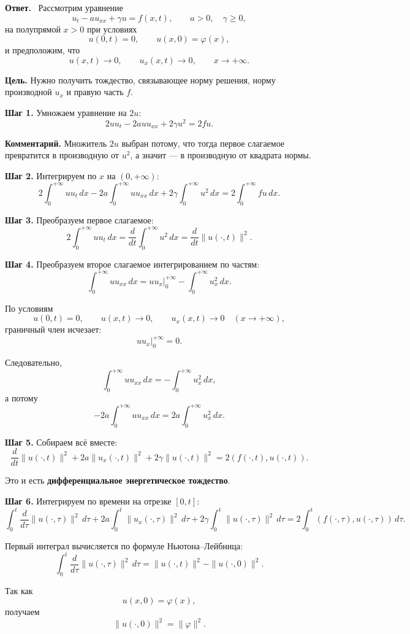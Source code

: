 \documentclass[a4paper,12pt]{article}
\newcommand{\Answer}{\textbf{Ответ.}\ }
\begin{document}
\Answer
Рассмотрим уравнение
\[
u_t-a u_{xx}+\gamma u=f(x,t),
\qquad a>0,\quad \gamma\ge 0,
\]
на полупрямой $x>0$ при условиях
\[
u(0,t)=0,
\qquad
u(x,0)=\varphi(x),
\]
и предположим, что
\[
u(x,t)\to 0,
\qquad
u_x(x,t)\to 0,
\qquad x\to +\infty.
\]

\textbf{Цель.} Нужно получить тождество, связывающее норму решения, норму производной $u_x$ и правую часть $f$.

\textbf{Шаг 1.} Умножаем уравнение на $2u$:
\[
2u u_t-2a u u_{xx}+2\gamma u^2=2fu.
\]

\textbf{Комментарий.} Множитель $2u$ выбран потому, что тогда первое слагаемое превратится в производную от $u^2$, а значит --- в производную от квадрата нормы.

\textbf{Шаг 2.} Интегрируем по $x$ на $(0,+\infty)$:
\[
2\int_0^{+\infty}u u_t\,dx
-2a\int_0^{+\infty}u u_{xx}\,dx
+2\gamma\int_0^{+\infty}u^2\,dx
=
2\int_0^{+\infty}fu\,dx.
\]

\textbf{Шаг 3.} Преобразуем первое слагаемое:
\[
2\int_0^{+\infty}u u_t\,dx
=
\frac{d}{dt}\int_0^{+\infty}u^2\,dx
=
\frac{d}{dt}\|u(\cdot,t)\|^2.
\]

\textbf{Шаг 4.} Преобразуем второе слагаемое интегрированием по частям:
\[
\int_0^{+\infty}u u_{xx}\,dx
=
\left.u u_x\right|_{0}^{+\infty}
-\int_0^{+\infty}u_x^2\,dx.
\]

По условиям
\[
u(0,t)=0,
\qquad
u(x,t)\to 0,
\qquad
u_x(x,t)\to 0
\quad (x\to +\infty),
\]
граничный член исчезает:
\[
\left.u u_x\right|_{0}^{+\infty}=0.
\]

Следовательно,
\[
\int_0^{+\infty}u u_{xx}\,dx=-\int_0^{+\infty}u_x^2\,dx,
\]
а потому
\[
-2a\int_0^{+\infty}u u_{xx}\,dx
=
2a\int_0^{+\infty}u_x^2\,dx.
\]

\textbf{Шаг 5.} Собираем всё вместе:
\[
\frac{d}{dt}\|u(\cdot,t)\|^2
+2a\|u_x(\cdot,t)\|^2
+2\gamma\|u(\cdot,t)\|^2
=
2(f(\cdot,t),u(\cdot,t)).
\]

Это и есть \textbf{дифференциальное энергетическое тождество}.

\textbf{Шаг 6.} Интегрируем по времени на отрезке $[0,t]$:
\[
\int_0^t \frac{d}{d\tau}\|u(\cdot,\tau)\|^2\,d\tau
+2a\int_0^t \|u_x(\cdot,\tau)\|^2\,d\tau
+2\gamma\int_0^t \|u(\cdot,\tau)\|^2\,d\tau
=
2\int_0^t (f(\cdot,\tau),u(\cdot,\tau))\,d\tau.
\]

Первый интеграл вычисляется по формуле Ньютона--Лейбница:
\[
\int_0^t \frac{d}{d\tau}\|u(\cdot,\tau)\|^2\,d\tau
=
\|u(\cdot,t)\|^2-\|u(\cdot,0)\|^2.
\]

Так как
\[
u(x,0)=\varphi(x),
\]
получаем
\[
\|u(\cdot,0)\|^2=\|\varphi\|^2.
\]
\end{document}
